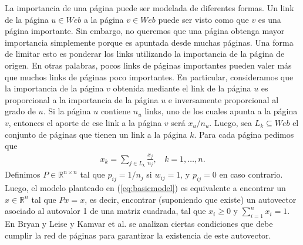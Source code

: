La importancia de una p\'agina puede ser modelada de diferentes formas. Un link de la p\'agina $u \in
Web$ a la p\'agina $v \in Web$ puede ser visto como que $v$ es una p\'agina importante. Sin embargo, no queremos que una
p\'agina obtenga mayor importancia simplemente porque es apuntada desde muchas p\'aginas. 
Una forma de limitar esto es ponderar los links utilizando la importancia de la p\'agina de origen. En otras palabras,
pocos links de p\'aginas importantes pueden valer m\'as que muchos links de p\'aginas poco importantes. En particular,
consideramos que la importancia de la p\'agina $v$ obtenida mediante el link de la p\'agina $u$ es proporcional a la 
importancia de la p\'agina $u$ e inversamente proporcional al grado de $u$. Si la p\'agina $u$ contiene $n_u$ links,
uno de los cuales apunta a la p\'agina $v$, entonces el aporte de ese link a la p\'agina $v$ ser\'a $x_u/n_u$. Luego,
sea $L_k \subseteq Web$ el conjunto de p\'aginas que tienen un link a la p\'agina $k$. Para cada p\'agina pedimos que
\begin{eqnarray}
x_k = \sum_{j \in L_k} \frac{x_j}{n_j},~~~~k = 1,\dots,n. \label{eq:basicmodel}
\end{eqnarray}
Definimos $P \in  \mathbb{R}^{n \times n}$ tal que $p_{ij} = 1/n_j$ si $w_{ij} = 1$, y $p_{ij} = 0$ en caso contrario. Luego,
el modelo planteado en (\ref{eq:basicmodel}) es equivalente a encontrar un $x\in \mathbb{R}^n$ tal que $Px = x$, es
decir, encontrar (suponiendo que existe) un autovector asociado al autovalor 1 de una matriz cuadrada, tal que $x_i \ge
0$ y $\sum_{i = 1}^n x_i = 1$. En
Bryan y Leise \cite{Bryan2006} y Kamvar et al. \cite[Secci\'on 1]{Kamvar2003} se analizan ciertas condiciones que debe
cumplir la red de p\'aginas para garantizar la existencia de este autovector.

